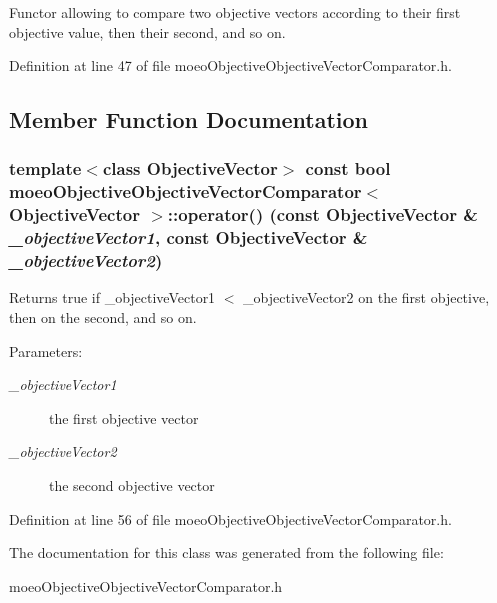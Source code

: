 Functor allowing to compare two objective vectors according to their first objective value, then their second, and so on. 



Definition at line 47 of file moeo\-Objective\-Objective\-Vector\-Comparator.h.

\subsection{Member Function Documentation}
\subsubsection{\setlength{\rightskip}{0pt plus 5cm}template$<$class Objective\-Vector$>$ const bool \bf{moeo\-Objective\-Objective\-Vector\-Comparator}$<$ Objective\-Vector $>$::operator() (const Objective\-Vector \& {\em \_\-objective\-Vector1}, const Objective\-Vector \& {\em \_\-objective\-Vector2})\hspace{0.3cm}{\tt  [inline]}}\label{classmoeoObjectiveObjectiveVectorComparator_bc3c97b380e87107e92f52843a7f9303}


Returns true if \_\-objective\-Vector1 $<$ \_\-objective\-Vector2 on the first objective, then on the second, and so on. 

\begin{Desc}
\item[Parameters:]
\begin{description}
\item[{\em \_\-objective\-Vector1}]the first objective vector \item[{\em \_\-objective\-Vector2}]the second objective vector \end{description}
\end{Desc}


Definition at line 56 of file moeo\-Objective\-Objective\-Vector\-Comparator.h.

The documentation for this class was generated from the following file:\begin{CompactItemize}
\item 
moeo\-Objective\-Objective\-Vector\-Comparator.h\end{CompactItemize}
